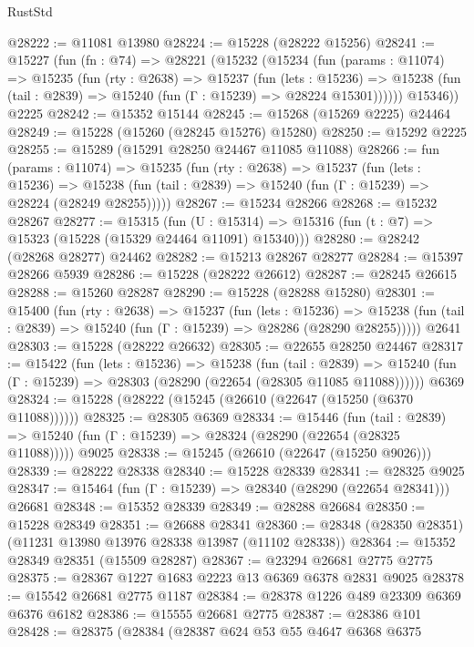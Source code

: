 \begin{lexlean}{RustStd}
\begin{coremodule}
@28222 := @11081 @13980
@28224 := @15228 (@28222 @15256)
@28241 := @15227
    (fun (fn : @74) =>
    @28221
      (@15232
        (@15234
          (fun (params : @11074) =>
          @15235
            (fun (rty : @2638) =>
            @15237
              (fun (lets : @15236) =>
              @15238 (fun (tail : @2839) => @15240 (fun (Γ : @15239) => @28224 @15301))))))
        @15346))
    @2225
@28242 := @15352 @15144
@28245 := @15268 (@15269 @2225) @24464
@28249 := @15228 (@15260 (@28245 @15276) @15280)
@28250 := @15292 @2225
@28255 := @15289 (@15291 @28250 @24467 @11085 @11088)
@28266 := fun (params : @11074) =>
  @15235
    (fun (rty : @2638) =>
    @15237
      (fun (lets : @15236) =>
      @15238 (fun (tail : @2839) => @15240 (fun (Γ : @15239) => @28224 (@28249 @28255)))))
@28267 := @15234 @28266
@28268 := @15232 @28267
@28277 := @15315
    (fun (U : @15314) => @15316 (fun (t : @7) => @15323 (@15228 (@15329 @24464 @11091) @15340)))
@28280 := @28242 (@28268 @28277) @24462
@28282 := @15213 @28267 @28277
@28284 := @15397 @28266 @5939
@28286 := @15228 (@28222 @26612)
@28287 := @28245 @26615
@28288 := @15260 @28287
@28290 := @15228 (@28288 @15280)
@28301 := @15400
    (fun (rty : @2638) =>
    @15237
      (fun (lets : @15236) =>
      @15238 (fun (tail : @2839) => @15240 (fun (Γ : @15239) => @28286 (@28290 @28255)))))
    @2641
@28303 := @15228 (@28222 @26632)
@28305 := @22655 @28250 @24467
@28317 := @15422
    (fun (lets : @15236) =>
    @15238
      (fun (tail : @2839) =>
      @15240 (fun (Γ : @15239) => @28303 (@28290 (@22654 (@28305 @11085 @11088))))))
    @6369
@28324 := @15228 (@28222 (@15245 (@26610 (@22647 (@15250 (@6370 @11088))))))
@28325 := @28305 @6369
@28334 := @15446
    (fun (tail : @2839) => @15240 (fun (Γ : @15239) => @28324 (@28290 (@22654 (@28325 @11088)))))
    @9025
@28338 := @15245 (@26610 (@22647 (@15250 @9026)))
@28339 := @28222 @28338
@28340 := @15228 @28339
@28341 := @28325 @9025
@28347 := @15464 (fun (Γ : @15239) => @28340 (@28290 (@22654 @28341))) @26681
@28348 := @15352 @28339
@28349 := @28288 @26684
@28350 := @15228 @28349
@28351 := @26688 @28341
@28360 := @28348 (@28350 @28351) (@11231 @13980 @13976 @28338 @13987 (@11102 @28338))
@28364 := @15352 @28349 @28351 (@15509 @28287)
@28367 := @23294 @26681 @2775 @2775
@28375 := @28367 @1227 @1683 @2223 @13 @6369 @6378 @2831 @9025
@28378 := @15542 @26681 @2775 @1187
@28384 := @28378 @1226 @489 @23309 @6369 @6376 @6182
@28386 := @15555 @26681 @2775
@28387 := @28386 @101
@28428 := @28375
    (@28384
      (@28387
        @624
        @53
        @55
        @4647
        @6368
        @6375

\end{coremodule}
\end{lexlean}
